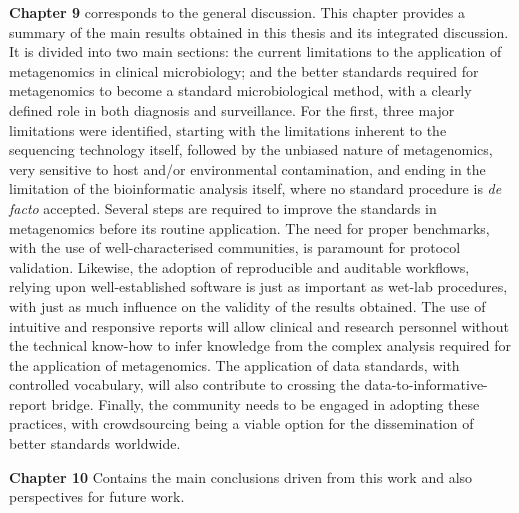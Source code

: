 \textbf{Chapter 9} corresponds to the general discussion. This chapter provides a summary of the main results obtained in this thesis and its integrated discussion. It is divided into two main sections: the current limitations to the application of metagenomics in clinical microbiology; and the better standards required for metagenomics to become a standard microbiological method, with a clearly defined role in both diagnosis and surveillance. For the first, three major limitations were identified, starting with the limitations inherent to the sequencing technology itself, followed by the unbiased nature of metagenomics, very sensitive to host and/or environmental contamination, and ending in the limitation of the bioinformatic analysis itself, where no standard procedure is \textit{de facto} accepted. Several steps are required to improve the standards in metagenomics before its routine application. The need for proper benchmarks, with the use of well-characterised communities, is paramount for protocol validation. Likewise, the adoption of reproducible and auditable workflows, relying upon well-established software is just as important as wet-lab procedures, with just as much influence on the validity of the results obtained. The use of intuitive and responsive reports will allow clinical and research personnel without the technical know-how to infer knowledge from the complex analysis required for the application of metagenomics. The application of data standards, with controlled vocabulary, will also contribute to crossing the data-to-informative-report bridge. Finally, the community needs to be engaged in adopting these practices, with crowdsourcing being a viable option for the dissemination of better standards worldwide. 


\textbf{Chapter 10} Contains the main conclusions driven from this work and also perspectives for future work. 